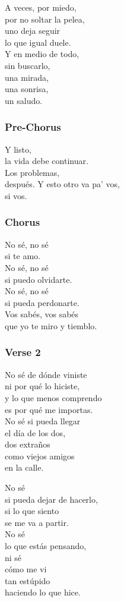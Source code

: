 \documentclass[]{article}
\begin{document}
A veces, por miedo,\\
por no soltar la pelea,\\
uno deja seguir\\
lo que igual duele.\\
Y en medio de todo,\\
sin buscarlo,\\
una mirada,\\
una sonrisa,\\
un saludo.

\subsubsection{Pre-Chorus}\label{pre-chorus-32}

Y listo,\\
la vida debe continuar.\\
Los problemas,\\
después. Y esto otro va pa' vos,\\
si vos.

\subsubsection{Chorus}\label{chorus-49}

No sé, no sé\\
si te amo.\\
No sé, no sé\\
si puedo olvidarte.\\
No sé, no sé\\
si pueda perdonarte.\\
Vos sabés, vos sabés\\
que yo te miro y tiemblo.

\subsubsection{Verse 2}\label{verse-2-16}

No sé de dónde viniste\\
ni por qué lo hiciste,\\
y lo que menos comprendo\\
es por qué me importas.\\
No sé si pueda llegar\\
el día de los dos,\\
dos extraños\\
como viejos amigos\\
en la calle.

No sé\\
si pueda dejar de hacerlo,\\
si lo que siento\\
se me va a partir.\\
No sé\\
lo que estás pensando,\\
ni sé\\
cómo me vi\\
tan estúpido\\
haciendo lo que hice.
\end{document}
